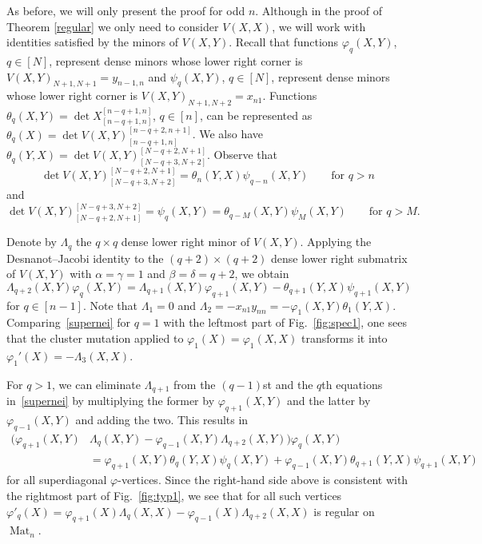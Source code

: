 \documentclass{amsart}
\theoremstyle{definition}
\theoremstyle{remark}
\numberwithin{equation}{section}
\numberwithin{theorem}{section}
\begin{document}
  As before, we will only present the proof for odd $n$. Although in the proof of Theorem \ref{regular} 
  we only need to consider $V(X,X)$, we will work with identities satisfied by the minors of $V(X,Y)$.
Recall that functions ${{\varphi}}_q(X,Y)$, $q\in [N]$, represent dense minors whose lower right corner 
is $V(X,Y)_{N+1,N+1}=y_{n-1, n}$
  and ${{\psi}}_q(X,Y)$, $q\in [N]$, represent dense minors whose lower right corner  is $V(X,Y)_{N+1,N+2}=x_{n1}$. 
  Functions ${{\theta}}_q(X,Y)=\det X_{[n-q+1,n]}^{[n-q+1,n]}$, $q\in [n]$, can be represented as 
  ${{\theta}}_q(X)=\det V(X,Y)_{[n-q+1,n]}^{[n-q+2,n+1]}$. We also have 
  $\theta_q(Y,X)=\det V(X,Y)_{[N-q+3,N+2]}^{[N-q+2,N+1]}$. Observe that 
$$
\det V(X,Y)_{[N-q+3,N+2]}^{[N-q+2,N+1]} = {{\theta}}_n(Y,X) {{\psi}}_{q-n} (X, Y)\qquad\text{for $q> n$}
$$
and 
$$
\det V(X,Y)^{[N-q+3,N+2]}_{[N-q+2,N+1]} ={{\psi}}_q(X,Y)= {{\theta}}_{q-M}(X,Y) {{\psi}}_{M} (X, Y)\qquad
 \text{for $q> M$}.
$$
 

Denote by $\Lambda_q$ the $q\times q$ dense lower right minor of $V(X,Y)$. 
Applying the Desnanot--Jacobi identity to the $(q+2) \times (q+2)$ dense lower right submatrix of $V(X,Y)$
with $\alpha=\gamma=1$ and $\beta=\delta=q+2$, we obtain
\begin{equation}\label{supernei}
\Lambda_{q+2}(X, Y){{\varphi}}_q (X,Y) = \Lambda_{q+1}(X, Y){{\varphi}}_{q+1} (X,Y) - {{\theta}}_{q+1}(Y,X){{\psi}}_{q+1} (X,Y) 
\end{equation}
for $q\in [n-1]$. Note that
$\Lambda_1=0$ and $\Lambda_2=- x_{n1} y_{n n} = - {{\varphi}}_1(X,Y) {{\theta}}_1(Y,X)$.
Comparing~\eqref{supernei} for $q=1$ with the leftmost part of Fig.~\ref{fig:spec1}, one sees that the 
cluster mutation applied to 
${{\varphi}}_1(X)={{\varphi}}_1(X,X)$ transforms it into ${{\varphi}}_1'(X)=-\Lambda_3(X,X)$. 

For $q > 1$, we can eliminate $\Lambda_{q+1}$ from the $(q-1)$st and the $q$th equations in~\eqref{supernei} 
by multiplying the former by ${{\varphi}}_{q+1}(X,Y)$ and the latter by ${{\varphi}}_{q-1}(X,Y)$ and adding the two. 
This results in
\begin{equation*}
\begin{aligned}
({{\varphi}}_{q+1}(X,Y)&\Lambda_{q}(X, Y)- {{\varphi}}_{q-1}(X,Y)\Lambda_{q+2}(X, Y) ){{\varphi}}_q (X,Y) \\
&   = {{\varphi}}_{q+1}(X, Y){{\theta}}_q(Y,X){{\psi}}_{q} (X,Y) + {{\varphi}}_{q-1}(X, Y){{\theta}}_{q+1}(Y,X){{\psi}}_{q+1} (X,Y)
\end{aligned}
\end{equation*}
for all superdiagonal ${{\varphi}}$-vertices.
Since the right-hand side above is consistent with the rightmost part of Fig.~\ref{fig:typ1},
 we see that for all such vertices 
 ${{\varphi}}'_q (X) = {{\varphi}}_{q+1}(X)\Lambda_{q}(X, X)- {{\varphi}}_{q-1}(X)\Lambda_{q+2}(X, X)$ is regular
on ${\operatorname{Mat}}_n$. 
\end{document}
